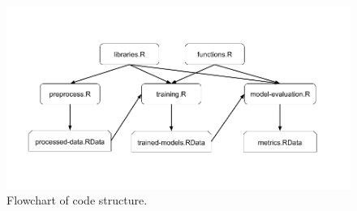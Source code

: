 \documentclass[12pt,]{article}
\begin{document}
\begin{figure}[H]

{\centering \includegraphics[width=1\linewidth]{images/r-code-chart} 

}

\caption{\label{fig:r-code-chart}Flowchart of code structure.}\label{fig:unnamed-chunk-17}
\end{figure}

\newpage

\printbibliography
\end{document}
